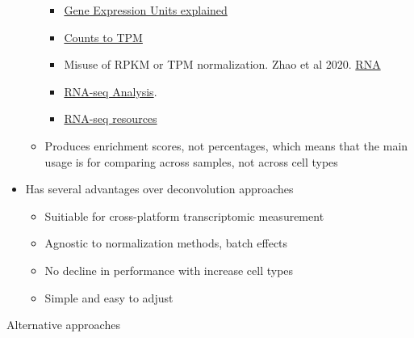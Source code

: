 \documentclass[]{book}
\providecommand{\tightlist}{%
  \setlength{\itemsep}{0pt}\setlength{\parskip}{0pt}}
\begin{document}
\begin{itemize}
\begin{itemize}
    \begin{itemize}
    \tightlist
    \item
      \href{https://reneshbedre.github.io/blog/expression_units.html}{Gene Expression Units explained}
    \item
      \href{https://gist.github.com/slowkow/c6ab0348747f86e2748b}{Counts to TPM}
    \item
      Misuse of RPKM or TPM normalization. Zhao et al 2020. \href{https://rnajournal.cshlp.org/content/26/8/903}{RNA}
    \item
      \href{https://compgenomr.github.io/book/rnaseqanalysis.html}{RNA-seq Analysis}.
    \item
      \href{https://github.com/crazyhottommy/RNA-seq-analysis}{RNA-seq resources}
    \end{itemize}
  \item
    Produces enrichment scores, not percentages, which means that the main usage is for comparing across samples, not across cell types
  \end{itemize}
\item
  Has several advantages over deconvolution approaches

  \begin{itemize}
  \tightlist
  \item
    Suitiable for cross-platform transcriptomic measurement
  \item
    Agnostic to normalization methods, batch effects
  \item
    No decline in performance with increase cell types
  \item
    Simple and easy to adjust
  \end{itemize}
\end{itemize}

Alternative approaches
\end{document}
